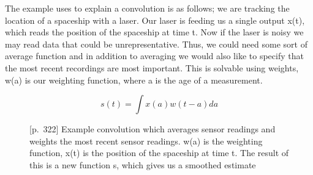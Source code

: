 The example \cite{goodfellow_deep_2016} uses to explain a convolution is as follows; we are tracking the location of a spaceship with a laser. Our laser is feeding us a single output x(t), which reads the position of the spaceship at time t. Now if the laser is noisy we may read data that could be unrepresentative. Thus, we could need some sort of average function and in addition to averaging we would also like to specify that the most recent recordings are most important. This is solvable using weights, w(a) is our weighting function, where a is the age of a measurement.
\begin{figure}[H]
    \label{eqn:conv}
    \begin{equation}
    s(t) = \int x(a)w(t-a) da
    \end{equation}
    \caption{\cite{goodfellow_deep_2016}[p.~322] Example convolution which averages sensor readings and weights the most recent sensor readings. w(a) is the weighting function, x(t) is the position of the spaceship at time t. The result of this is a new function s, which gives us a smoothed estimate}
\end{figure}


